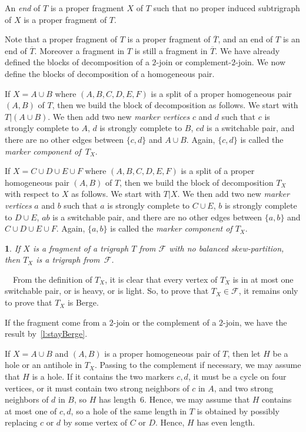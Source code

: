 \documentclass[11 pt] {article}
\newtheorem{theorem}{}[section]
\newcounter{claim}
\newcommand{\Proof}{\setcounter{claim}{0}\noindent{\bf Proof.}\ \ }
\begin{document}
An \emph{end} of $T$ is a proper fragment $X$ of $T$ such that no
proper induced subtrigraph of $X$ is a proper fragment of $T$.

Note that a proper fragment of $T$ is a proper fragment of
$\overline{T}$, and an end of $T$ is an end of
$\overline{T}$. Moreover a fragment in $T$ is still a fragment in
$\overline{T}$. We have already defined the blocks of decomposition of
a $2$-join or complement-$2$-join.  We now define the blocks of
decomposition of a homogeneous pair.

If $X = A\cup B$ where $(A,B,C,D,E,F)$ is a split of a proper
homogeneous pair $(A,B)$ of $T$, then we build the block of
decomposition as follows. We start with $T | (A\cup B)$. We then add
two new \emph{marker vertices} $c$ and $d$ such that $c$ is strongly
complete to $A$, $d$ is strongly complete to $B$, $cd$ is a
switchable pair, and there are no other edges between $\{c,d\}$ and $A
\cup B$.  Again, $\{c, d\}$ is called the \emph{marker component of~$T_X$}.



If $X = C \cup D \cup E \cup F$ where $(A,B,C,D,E,F)$ is a
split of a proper homogeneous pair $(A,B)$ of $T$, then we build the
block of decomposition $T_{X}$ with respect to $X$ as follows. We
start with $T|X$. We then add two new \emph{marker vertices} $a$ and
$b$ such that $a$ is strongly complete to $C\cup E$, $b$ is strongly
complete to $D\cup E$, $ab$ is a switchable pair, and there are no
other edges between $\{a,b\}$ and $C \cup D \cup E \cup F$.  Again,
$\{a, b\}$ is called the \emph{marker component of $T_X$}.

\begin{theorem}
 \label{l:stayBergeExt}
 If $X$ is a fragment of a trigraph $T$ from $\mathcal F$ with no
 balanced skew-partition, then $T_X$ is a trigraph from~$\mathcal F$.
\end{theorem}

\Proof From the definition of $T_X$, it is clear that every vertex of
$T_X$ is in at most one switchable pair, or is heavy, or is light.
So, to prove that $T_X \in {\mathcal F}$, it remains only to prove
that $T_X$ is Berge.

If the fragment come from a $2$-join or the complement of a $2$-join,
we have the result by~\ref{l:stayBerge}.

If $X = A \cup B$ and $(A, B)$ is a proper homogeneous pair of $T$,
then let $H$ be a hole or an antihole in $T_X$. Passing to the
complement if necessary, we may assume that $H$ is a hole. If it
contains the two markers $c, d$, it must be a cycle on four vertices,
or it must contain two strong neighbors of $c$ in $A$, and two strong
neighbors of $d$ in $B$, so $H$ has length~6. Hence, we may assume
that $H$ contains at most one of $c, d$, so a hole of the same length
in $T$ is obtained by possibly replacing $c$ or $d$ by some vertex of
$C$ or $D$. Hence, $H$ has even length.
\end{document}
